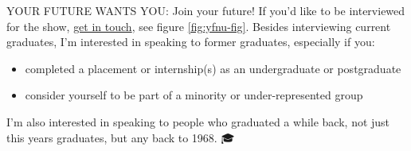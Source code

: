 \documentclass[
]{book}
\providecommand{\tightlist}{%
  \setlength{\itemsep}{0pt}\setlength{\parskip}{0pt}}
\begin{document}
YOUR FUTURE WANTS YOU: Join your future! If you'd like to be interviewed for the show, \href{https://personalpages.manchester.ac.uk/staff/duncan.hull/contact}{get in touch}, see figure \ref{fig:yfnu-fig}. Besides interviewing current graduates, I'm interested in speaking to former graduates, especially if you:

\begin{itemize}
\tightlist
\item
  completed a placement or internship(s) as an undergraduate or postgraduate
\item
  consider yourself to be part of a minority or under-represented group
\end{itemize}

I'm also interested in speaking to people who graduated a while back, not just this years graduates, but any back to 1968. 🎓 \citep{babygrowsup}
\end{document}

